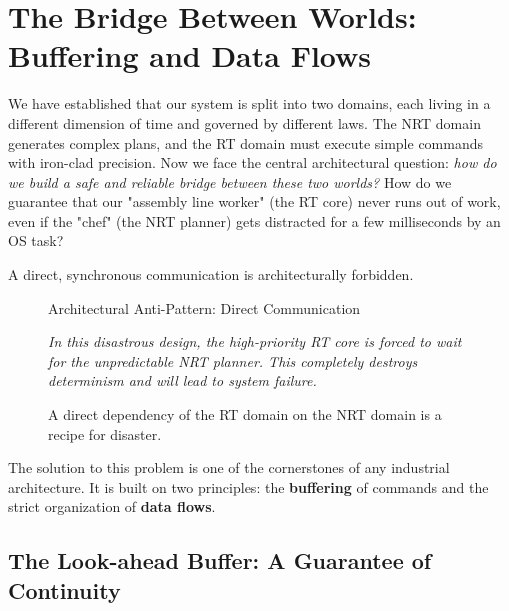 \section{The Bridge Between Worlds: Buffering and Data Flows}
\label{sec:buffering_and_flows}

We have established that our system is split into two domains, each living in a different dimension of time and governed by different laws. The NRT domain generates complex plans, and the RT domain must execute simple commands with iron-clad precision. Now we face the central architectural question: \textit{how do we build a safe and reliable bridge between these two worlds?} How do we guarantee that our "assembly line worker" (the RT core) never runs out of work, even if the "chef" (the NRT planner) gets distracted for a few milliseconds by an OS task?

A direct, synchronous communication is architecturally forbidden.

\begin{figure}[h!]
    \centering
    \begin{dangerbox}{Architectural Anti-Pattern: Direct Communication}
        \vspace{0.1cm}
        \vspace{0.2cm}
        
        \textit{In this disastrous design, the high-priority RT core is forced to wait for the unpredictable NRT planner. This completely destroys determinism and will lead to system failure.}
    \end{dangerbox}
    \caption{A direct dependency of the RT domain on the NRT domain is a recipe for disaster.}
    \label{fig:direct_comm_antipattern}
\end{figure}

The solution to this problem is one of the cornerstones of any industrial architecture. It is built on two principles: the \textbf{buffering} of commands and the strict organization of \textbf{data flows}.

\subsection{The Look-ahead Buffer: A Guarantee of Continuity}
\label{subsec:look_ahead_buffer}

